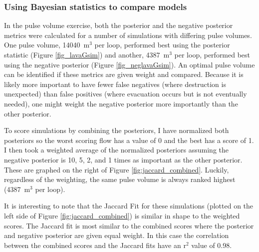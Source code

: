 \documentclass[12pt,letter]{article}
\begin{document}
		\subsubsection{Using Bayesian statistics to compare models}

		In the pulse volume exercise, both the posterior and the negative posterior metrics were calculated for a number of simulations with differing pulse volumes. One pulse volume, 14040~m$^3$ per loop, performed best using the posterior statistic (Figure \ref{fig_lavaGsim}) and another, 4387~m$^3$ per loop, performed best using the negative posterior (Figure \ref{fig_neglavaGsim}). An optimal pulse volume can be identified if these metrics are given weight and compared. Because it is likely more important to have fewer false negatives (where destruction is unexpected) than false positives (where evacuation occurs but is not eventually needed), one might weight the negative posterior more importantly than the other posterior.

		To score simulations by combining the posteriors, I have normalized both posteriors so the worst scoring flow has a value of 0 and the best has a score of 1. I then took a weighted average of the normalized posteriors assuming the negative posterior is 10, 5, 2, and 1 times as important as the other posterior. These are graphed on the right of Figure \ref{fig:jaccard_combined}. Luckily, regardless of the weighting, the same pulse volume is always ranked highest (4387~m$^3$ per loop).

		It is interesting to note that the Jaccard Fit for these simulations (plotted on the left side of Figure \ref{fig:jaccard_combined}) is similar in shape to the weighted scores. The Jaccard fit is most similar to the combined scores where the posterior and negative posterior are given equal weight. In this case the correlation between the combined scores and the Jaccard fits have an r$^2$ value of 0.98.

\end{document}
